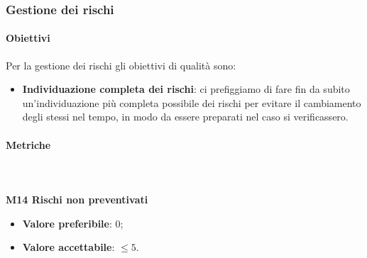 		\subsubsection{Gestione dei rischi} 
			\paragraph{Obiettivi}
			Per la gestione dei rischi gli obiettivi di qualità sono:
			\begin{itemize}
				\item \textbf{Individuazione completa dei rischi}: ci prefiggiamo di fare fin da subito un'individuazione più completa possibile dei rischi per evitare il cambiamento degli stessi nel tempo, in modo da essere preparati nel caso si verificassero.
			\end{itemize}
			\paragraph{Metriche} \mbox{} \\ \\
			\textbf{M14 Rischi non preventivati} 
			\begin{itemize}
				\item \textbf{Valore preferibile}: 0;
				\item \textbf{Valore accettabile}: $ \le 5$.
			\end{itemize}			

